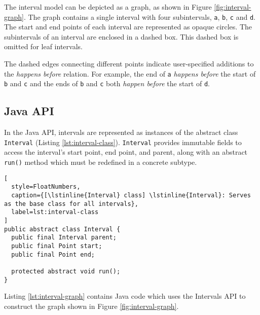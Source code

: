 The interval model can be depicted as a graph, as shown in Figure
\ref{fig:interval-graph}. The graph contains a single interval with
four subintervals, \lstinline|a|, \lstinline|b|, \lstinline|c| and
\lstinline|d|. The start and end points of each interval are
represented as opaque circles. The subintervals of an interval are
enclosed in a dashed box. This dashed box is omitted for leaf
intervals.

The dashed edges connecting different points indicate user-specified
additions to the \emph{happens before} relation. For example, the end
of \lstinline|a| \emph{happens before} the start of \lstinline|b| and
\lstinline|c| and the ends of \lstinline|b| and \lstinline|c| both
\emph{happen before} the start of \lstinline|d|.

\subsection{Java API}
\label{sec:intro-intervals-java-api}

In the Java API, intervals are represented as instances of the
abstract class \lstinline|Interval| (Listing
\ref{lst:interval-class}). \lstinline|Interval| provides immutable
fields to access the interval's start point, end point, and parent,
along with an abstract \lstinline|run()| method which must be
redefined in a concrete subtype.

\begin{lstlisting}[
  style=FloatNumbers, 
  caption={[\lstinline{Interval} class] \lstinline{Interval}: Serves as the base class for all intervals},
  label=lst:interval-class
]
public abstract class Interval {
  public final Interval parent;
  public final Point start;
  public final Point end;

  protected abstract void run();
}
\end{lstlisting}

Listing \ref{lst:interval-graph} contains Java code which uses the
Intervals API to construct the graph shown in Figure
\ref{fig:interval-graph}.


